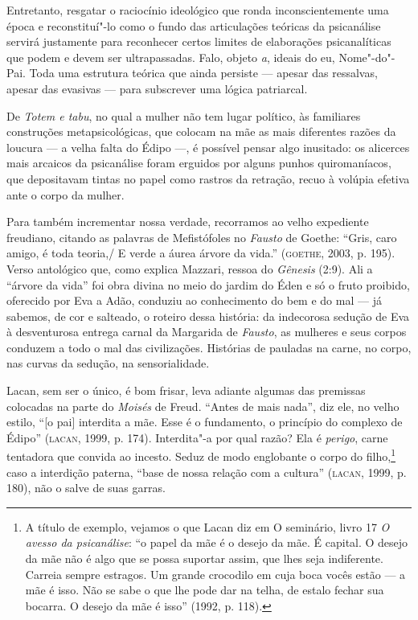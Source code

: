 Entretanto, resgatar o raciocínio ideológico que ronda inconscientemente
uma época e reconstituí"-lo como o fundo das articulações teóricas da
psicanálise servirá justamente para reconhecer certos limites de
elaborações psicanalíticas que podem e devem ser ultrapassadas. Falo,
objeto \emph{a}, ideais do eu, Nome"-do"-Pai. Toda uma estrutura teórica
que ainda persiste --- apesar das ressalvas, apesar das evasivas --- para
subscrever uma lógica patriarcal.

De \emph{Totem e tabu}, no qual a mulher não tem lugar político, às
familiares construções metapsicológicas, que colocam na mãe as mais
diferentes razões da loucura --- a velha falta do Édipo ---, é possível
pensar algo inusitado: os alicerces mais arcaicos da psicanálise foram
erguidos por alguns punhos quiromaníacos, que depositavam tintas no
papel como rastros da retração, recuo à volúpia efetiva ante o corpo da
mulher.

Para também incrementar nossa verdade, recorramos ao velho expediente
freudiano, citando as palavras de Mefistófoles no \emph{Fausto} de
Goethe: ``Gris, caro amigo, é toda teoria,/ E verde a áurea árvore da
vida.'' (\textsc{goethe}, 2003, p. 195). Verso antológico que, como explica
Mazzari, ressoa do \emph{Gênesis} (2:9). Ali a ``árvore da vida'' foi
obra divina no meio do jardim do Éden e só o fruto proibido, oferecido
por Eva a Adão, conduziu ao conhecimento do bem e do mal --- já sabemos,
de cor e salteado, o roteiro dessa história: da indecorosa sedução de
Eva à desventurosa entrega carnal da Margarida de \emph{Fausto}, as
mulheres e seus corpos conduzem a todo o mal das civilizações. Histórias
de pauladas na carne, no corpo, nas curvas da sedução, na
sensorialidade.

Lacan, sem ser o único, é bom frisar, leva adiante algumas das premissas
colocadas na parte  do \emph{Moisés} de Freud. ``Antes de mais
nada'', diz ele, no velho estilo, ``{[}o pai{]} interdita a mãe. Esse é
o fundamento, o princípio do complexo de Édipo'' (\textsc{lacan}, 1999,
p. 174). Interdita"-a por qual razão? Ela é \emph{perigo}, carne
tentadora que convida ao incesto. Seduz de modo englobante o corpo do
filho,\footnote{A título de exemplo, vejamos o que Lacan diz em O
  seminário, livro 17 \emph{O avesso da psicanálise}: ``o papel da mãe é o
      desejo da mãe. É capital. O desejo da mãe não é algo que se possa
      suportar assim, que lhes seja indiferente. Carreia sempre estragos. Um
      grande crocodilo em cuja boca vocês estão --- a mãe é isso. Não se sabe
      o que lhe pode dar na telha, de estalo fechar sua bocarra. O desejo da
      mãe é isso'' (1992, p. 118).} caso a interdição paterna, ``base
de nossa relação com a cultura'' (\textsc{lacan}, 1999, p. 180), não o
salve de suas garras.

